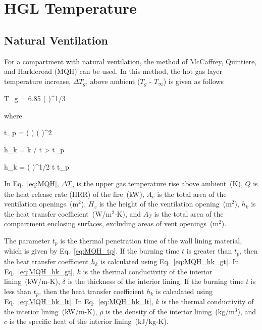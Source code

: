 \chapter{HGL Temperature}
\label{HGL:Chapter}

\section{Natural Ventilation}

For a compartment with natural ventilation, the method of McCaffrey, Quintiere, and Harkleroad (MQH) can be used. In this method, the hot gas layer temperature increase, $\Delta T_g$, above ambient ($T_g$ - $T_\infty$) is given as follows

\be
\Delta T_g = 6.85 \left(  \right)^{1/3}
\label{eq:MQH}
\ee

\noindent where

\be
t_p = \left(  \right) \left(  \right)^2
\label{eq:MQH_tp}
\ee

\be
h_k = k / \delta {} t > t_p
\label{eq:MQH_hk_gt}
\ee

\be
h_k = \left(  \right)^{1/2}  t \le t_p
\label{eq:MQH_hk_lt}
\ee

In Eq.~\ref{eq:MQH}, $\Delta T_g$ is the upper gas temperature rise above ambient~(K), $\dot Q$ is the heat release rate (HRR) of the fire~(kW), $A_v$ is the total area of the ventilation openings~(m$^2$), $H_v$ is the height of the ventilation opening~(m$^2$), $h_k$ is the heat transfer coefficient~(W/m$^2$-K), and $A_T$ is the total area of the compartment enclosing surfaces, excluding areas of vent openings~(m$^2$). 

The parameter $t_p$ is the thermal penetration time of the wall lining material, which is given by Eq.~\ref{eq:MQH_tp}. If the burning time $t$ is greater than $t_p$, then the heat transfer coefficient $h_k$ is calculated using Eq.~\ref{eq:MQH_hk_gt}. In Eq.~\ref{eq:MQH_hk_gt}, $k$ is the thermal conductivity of the interior lining~(kW/m-K), $\delta$ is the thickness of the interior lining. If the burning time $t$ is less than $t_p$, then the heat transfer coefficient $h_k$ is calculated using Eq.~\ref{eq:MQH_hk_lt}. In Eq.~\ref{eq:MQH_hk_lt}, $k$ is the thermal conductivity of the interior lining~(kW/m-K), $\rho$ is the density of the interior lining~(kg/m$^3$), and $c$ is the specific heat of the interior lining~(kJ/kg-K).

%
%
%
%


